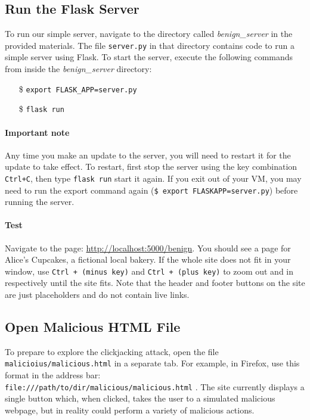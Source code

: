 
\subsection{Run the Flask Server} To run our simple server, navigate to
the directory called \textit{benign\_server} in the provided materials.
The file \texttt{server.py} in that directory contains code to run a
simple server using Flask. To start the server, execute the following
commands from inside the \textit{benign\_server} directory:
\begin{itemize} 
  \item[\$] \texttt{export FLASK\_APP=server.py} 
  \item[\$] \texttt{flask run} 
\end{itemize}

\paragraph{Important note} Any time you make an update to the server,
you will need to restart it for the update to take effect. To restart,
first stop the server using the key combination \texttt{Ctrl+C}, then
type \texttt{flask run} start it again. If you exit out of your VM, you
may need to run the export command again (\texttt{\$ export
FLASKAPP=server.py}) before running the server.

\paragraph{Test} Navigate to the page:
\href{http://localhost:5000/benign}{http://localhost:5000/benign}.
You should see a page for Alice's Cupcakes, a fictional local bakery. If
the whole site does not fit in your window, use \texttt{Ctrl + (minus
key)} and \texttt{Ctrl + (plus key)} to zoom out and in respectively
until the site fits.  Note that the header and footer buttons on the
site are just placeholders and do not contain live links.

\subsection{Open Malicious HTML File}

To prepare to explore the clickjacking attack, open the file
\texttt{malicioius/malicious.html} in a separate tab. For example, in
Firefox, use this format in the address bar:
\\\texttt{file:///path/to/dir/malicious/malicious.html}  .  The site
currently displays a single button which, when clicked, takes the user
to a simulated malicious webpage, but in reality could perform a variety
of malicious actions.  

